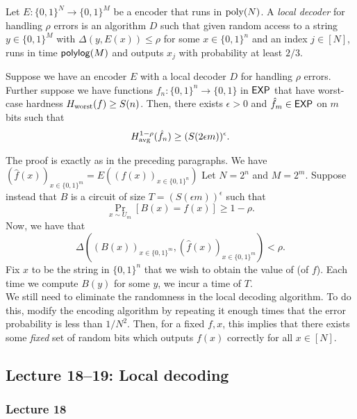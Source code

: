		\begin{fdef}
			Let $E : \{0,1\}^N \to \{0,1\}^M$ be a encoder that runs in $\operatorname{poly}(N)$. A \emph{local decoder} for handling $\rho$ errors is an algorithm $D$ such that given random access to a string $y \in \{0,1\}^M$ with $\Delta(y,E(x)) \le \rho$ for some $x \in \{0,1\}^n$ and an index $j \in [N]$, runs in time $\mathsf{polylog}(M)$ and outputs $x_j$ with probability at least $2/3$.
		\end{fdef}

		\begin{ftheo}
			Suppose we have an encoder $E$ with a local decoder $D$ for handling $\rho$ errors. Further suppose we have functions $f_n : \{0,1\}^n \to \{0,1\}$ in $\mathsf{EXP}$ that have worst-case hardness $H_{\text{worst}}(f) \ge S(n)$. Then, there exists $\epsilon > 0$ and $\hat{f}_{m} \in \mathsf{EXP}$ on $m$ bits such that
			\[ H_{\text{avg}}^{1-\rho}(\hat{f}_n) \ge (S (2 \epsilon m))^{\epsilon}. \]
		\end{ftheo}
		The proof is exactly as in the preceding paragraphs. We have $(\hat{f}(x))_{x \in \{0,1\}^m} = E( (f(x))_{x \in \{0,1\}^n} )$ Let $N = 2^n$ and $M = 2^m$. Suppose instead that $B$ is a circuit of size  $T = (S(\epsilon m))^\epsilon$ such that
		\[ \Pr_{x \sim U_m}[B(x) = f(x)] \ge 1 - \rho. \]
		Now, we have that
		\[ \Delta( ( B(x) )_{x \in \{0,1\}^m} , ( \hat{f}(x) )_{x \in \{0,1\}^m} ) < \rho. \]
		Fix $x$ to be the string in $\{0,1\}^n$ that we wish to obtain the value of (of $f$). Each time we compute $B(y)$ for some $y$, we incur a time of $T$.\\
		We still need to eliminate the randomness in the local decoding algorithm. To do this, modify the encoding algorithm by repeating it enough times that the error probability is less than $1/N^2$. Then, for a fixed $f,x$, this implies that there exists some \emph{fixed} set of random bits which outputs $f(x)$ correctly for all $x \in [N]$.

\subsection{Lecture 18--19: Local decoding}

	\subsubsection{Lecture 18}

